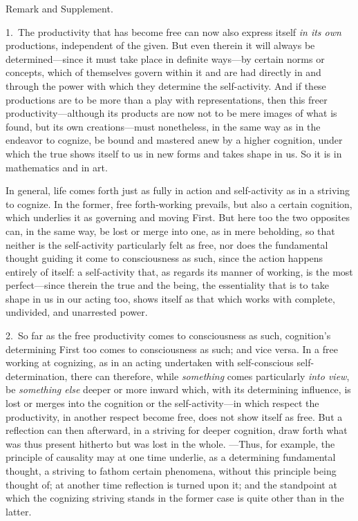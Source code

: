 \documentclass[12pt,a4paper]{book}
\begin{document}
\begin{center}Remark and Supplement.\end{center}
1.~The productivity that has become free can now also express itself \emph{in its
own} productions, independent of the given. But even therein it will always be
determined---since it must take place in definite ways---by certain norms or
concepts, which of themselves govern within it and are had directly in and
through the power with which they determine the self-activity. And if these
productions are to be more than a play with representations, then this freer
productivity---although its products are now not to be mere images of what is
found, but its own creations---must nonetheless, in the same way as in the
endeavor to cognize, be bound and mastered anew by a higher cognition, under
which the true shows itself to us in new forms and takes shape in us. So it is in
mathematics and in art.

In general, life comes forth just as fully in action and self-activity as in a
striving to cognize. In the former, free forth-working prevails, but also a
certain cognition, which underlies it as governing and moving First. But here too
the two opposites can, in the same way, be lost or merge into one, as in mere
beholding, so that neither is the self-activity particularly felt as free, nor
does the fundamental thought guiding it come to consciousness as such, since the
action happens entirely of itself: a self-activity that, as regards its manner of
working, is the most perfect---since therein the true and the being, the
essentiality that is to take shape in us in our acting too, shows itself as that
which works with complete, undivided, and unarrested power.

2.~So far as the free productivity comes to consciousness as such, cognition's
determining First too comes to consciousness as such; and vice versa. In a free
working at cognizing, as in an acting undertaken with self-conscious
self-determination, there can therefore, while \emph{something} comes
particularly \emph{into view}, be \emph{something else} deeper or more inward
which, with its determining influence, is lost or merges into the cognition or
the self-activity---in which respect the productivity, in another respect become
free, does not show itself as free. But a reflection can then afterward, in a
striving for deeper cognition, draw forth what was thus present hitherto but was
lost in the whole. ---Thus, for example, the principle of causality may at one
time underlie, as a determining fundamental thought, a striving to fathom certain
phenomena, without this principle being thought of; at another time reflection is
turned upon it; and the standpoint at which the cognizing striving stands in the
former case is quite other than in the latter.
\end{document}
